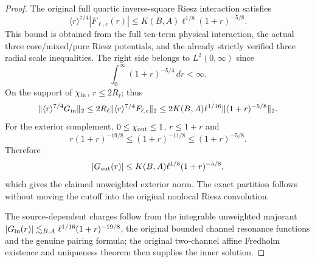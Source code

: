 \begin{proof}
The original full quartic inverse-square Riesz interaction satisfies
\[
 \langle r\rangle^{7/4}|F_{\ell,c}(r)|
 \le K(B,A)\ell^{1/8}(1+r)^{-5/8}.
\]
This bound is obtained from the full ten-term physical interaction,
the actual three core/mixed/pure Riesz potentials, and the already
strictly verified three radial scale inequalities. The right side
belongs to $L^2(0,\infty)$ since
\[
 \int_0^\infty(1+r)^{-5/4}\,dr<\infty.
\]
On the support of $\chi_{\rm in}$, $r\le2R_\ell$; thus
\[
 \|\langle r\rangle^{7/4}G_{\rm in}\|_2
 \le2R_\ell\|\langle r\rangle^{7/4}F_{\ell,c}\|_2
 \le2K(B,A)\ell^{1/16}
       \|(1+r)^{-5/8}\|_2.
\]
For the exterior complement, $0\le\chi_{\rm out}\le1$,
$r\le 1+r$ and
\[
 r(1+r)^{-19/8}\le (1+r)^{-11/8}
                            \le (1+r)^{-5/8}.
\]
Therefore
\[
 |G_{\rm out}(r)|
 \le K(B,A)\ell^{1/8}(1+r)^{-5/8},
\]
which gives the claimed unweighted exterior norm. The exact
partition follows without moving the cutoff into the original
nonlocal Riesz convolution.

The source-dependent charges follow from
the integrable unweighted majorant
$|G_{\rm in}(r)|\lesssim_{B,A}
\ell^{1/16}(1+r)^{-19/8}$, the original bounded
channel resonance functions and the genuine pairing formula;
the original two-channel affine Fredholm existence and
uniqueness theorem then supplies the inner solution.
\end{proof}

%
